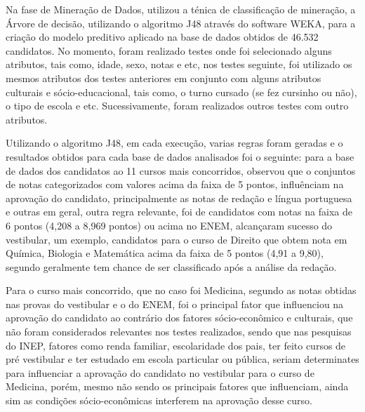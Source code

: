 \par
Na fase de Mineração de Dados,  utilizou a ténica de classificação de mineração, a Árvore de decisão, utilizando o algoritmo J48 através do software WEKA, para a criação do modelo preditivo aplicado na base de dados obtidos de 46.532 candidatos. No momento, foram realizado testes onde foi selecionado alguns atributos, tais como, idade, sexo, notas e etc, nos testes seguinte, foi utilizado os mesmos atributos dos testes anteriores em conjunto com alguns atributos culturais e sócio-educacional, tais como, o turno cursado (se fez cursinho ou não), o tipo de escola e etc. Sucessivamente, foram realizados outros testes com outro atributos.

\par
Utilizando o algoritmo J48, em cada execução, varias regras foram geradas e o resultados obtidos para cada base de dados analisados foi o seguinte: para a base de dados dos candidatos ao 11 cursos mais concorridos,  observou que o conjuntos de notas categorizados com valores acima da faixa de 5 pontos, influênciam na aprovação do candidato, principalmente as notas de redação e língua portuguesa e outras em geral, outra regra relevante, foi de candidatos com notas na faixa de 6 pontos (4,208 a 8,969 pontos) ou acima no ENEM, alcançaram sucesso do vestibular, um exemplo, candidatos para o curso de Direito que obtem nota em Química, Biologia e Matemática acima da faixa de 5 pontos (4,91 a 9,80), segundo  geralmente tem chance de ser classificado após a análise da redação.

\par
Para o curso mais concorrido, que no caso foi Medicina, segundo  as notas obtidas nas provas do vestibular e o do ENEM, foi o principal fator que influenciou na aprovação do candidato ao contrário dos fatores sócio-econômico e culturais, que não foram considerados relevantes nos testes realizados, sendo que nas pesquisas do INEP, fatores como renda familiar, escolaridade dos pais, ter feito cursos de pré vestibular e ter estudado em escola particular ou pública, seriam determinates para influenciar a aprovação do candidato no vestibular para o curso de Medicina, porém, mesmo não sendo os principais fatores que influenciam, ainda sim as condições sócio-econômicas interferem na aprovação desse curso. 

